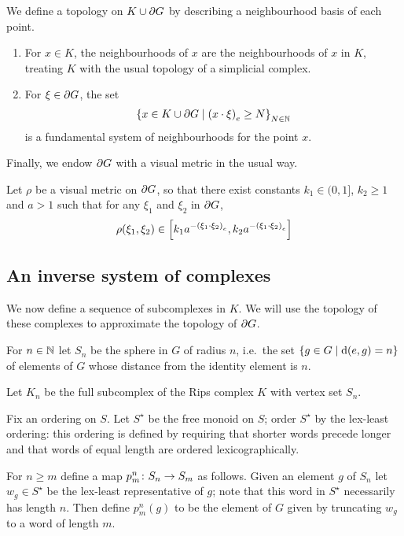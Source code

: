\documentclass[a4paper]{article}
\begin{document}
\begin{definition}
  We define a topology on $K \union \boundary G$ by describing a neighbourhood
  basis of each point.
  \begin{enumerate}
    \item For $x \in K$, the neighbourhoods of $x$ are the neighbourhoods of
      $x$ in $K$, treating $K$ with the usual topology of a simplicial complex.
    \item For $\xi \in \boundary G$, the set
      \begin{equation*}
        \set{x \in K \union \boundary G 
              \suchthat \gromov{e}{x}{\xi} \geq N}_{N\in\naturals}
      \end{equation*}
      is a fundamental system of neighbourhoods for the point $x$.
  \end{enumerate}
\end{definition}

Finally, we endow $\boundary G$ with a visual metric in the usual way.

\begin{definition}
  Let $\rho$ be a visual metric on $\boundary G$, so that there exist constants
  $k_1 \in (0,1]$, $k_2 \geq 1$ and $a > 1$ such that for any $\xi_1$ and
  $\xi_2$ in $\boundary G$,
  \begin{equation*}
    \rho(\xi_1, \xi_2) \in \left[k_1 a^{-\gromov{e}{\xi_1}{\xi_2}}, k_2
          a^{-\gromov{e}{\xi_1}{\xi_2}}\right]
  \end{equation*}
\end{definition}

\subsection{An inverse system of complexes}

We now define a sequence of subcomplexes in $K$. We will use the topology of
these complexes to approximate the topology of $\boundary G$. 

\begin{definition}
  For $n \in \naturals$ let $S_n$ be the sphere in $G$ of radius $n$, i.e.\ the 
  set $\set{g \in G \suchthat \dist(e, g) = n}$ of elements of $G$ whose 
  distance from the identity element is $n$. 

  Let $K_n$ be the full subcomplex of the Rips complex $K$ with vertex set
  $S_n$.
\end{definition}

\begin{definition}
  Fix an ordering on $S$. Let $S^\star$ be the free monoid on 
  $S$; order $S^\star$ by the lex-least ordering: this ordering is defined by 
  requiring that shorter words precede longer and that words of equal length are 
  ordered lexicographically. 

  For $n \geq m$ define a map $p^n_m \from S_n \to S_m$ as follows.
  Given an element $g$ of $S_n$ let $w_g \in S^\star$ be the lex-least
  representative of $g$; note that this word in $S^\star$ necessarily has
  length $n$.  Then define $p^n_m(g)$ to be the element of $G$ given by
  truncating $w_g$ to a word of length $m$.
\end{definition}
\end{document}
